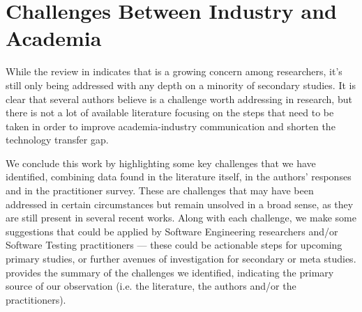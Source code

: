 \chapter{Challenges Between Industry and Academia}\label{chap:gap}


While the review in  indicates that \rea is a growing concern among \rt researchers, it's still only being addressed with any depth on a minority of secondary studies.
It is clear that several authors believe \rea is a challenge worth addressing in research, but there is not a lot of available \rt literature focusing on the steps that need to be taken in order to improve academia-industry communication and shorten the technology transfer gap.

We conclude this work by highlighting some key challenges that we have identified, combining data found in the literature itself, in the authors' responses and in the practitioner survey.
These are challenges that may have been addressed in certain circumstances but remain unsolved in a broad sense, as they are still present in several recent works.
Along with each challenge, we make some suggestions that could be applied by Software Engineering researchers and/or Software Testing practitioners — these could be actionable steps for upcoming primary studies, or further avenues of investigation for secondary or meta studies.
 provides the summary of the challenges we identified, indicating the primary source of our observation (i.e. the literature, the authors and/or the practitioners).

